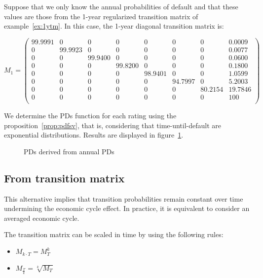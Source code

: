 \documentclass[11pt,fleqn]{book} %
\begin{document}
\begin{example}
	\label{ex:pdfsv}
	Suppose that we only know the annual probabilities of default and that these 
	values are those from the 1-year regularized transition matrix of 
	example~\ref{ex:1ytm}. In this case, the 1-year diagonal transition matrix 
	is:
	{\small
	\begin{displaymath}
		M_1 = \left(
		\begin{array}{cccccccc}
			99.9991 & 0 & 0 & 0 & 0 & 0 & 0 & 0.0009 \\
			0 & 99.9923 & 0 & 0 & 0 & 0 & 0 & 0.0077 \\
			0 & 0 & 99.9400 & 0 & 0 & 0 & 0 & 0.0600 \\
			0 & 0 & 0 & 99.8200 & 0 & 0 & 0 & 0.1800 \\
			0 & 0 & 0 & 0 & 98.9401 & 0 & 0 & 1.0599 \\
			0 & 0 & 0 & 0 & 0 & 94.7997 & 0 & 5.2003 \\
			0 & 0 & 0 & 0 & 0 & 0 & 80.2154 & 19.7846 \\
			0 & 0 & 0 & 0 & 0 & 0 & 0 & 100 \\
		\end{array}
		\right)
	\end{displaymath}\par}
	We determine the PDs function for each rating using the 
	proposition~\ref{prop:pdfsv}, that is, considering that time-until-default
	are exponential distributions. Results are displayed in figure~\ref{fig:pdfsv}. 
	\begin{figure}[!ht]
		\centering
		\caption{PDs derived from annual PDs}
		\label{fig:pdfsv}
	\end{figure}
\end{example}

\subsection{From transition matrix}
\label{pdftm}

This alternative implies that transition probabilities remain constant
over time undermining the economic cycle effect. In practice, it is 
equivalent to consider an averaged economic cycle.

\begin{proposition}
	The transition matrix can be scaled in time by using the following rules:
	\begin{itemize}
		\item $M_{k \cdot T} = M_{T}^k$
		\item $M_{\frac{T}{k}} = \sqrt[k]{M_{T}}$
	\end{itemize}
\end{proposition}
\end{document}
